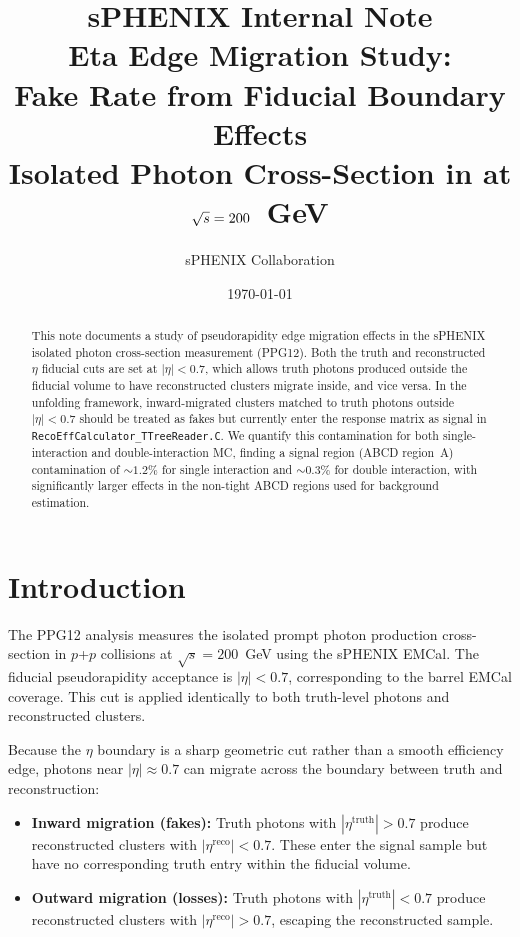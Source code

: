 \documentclass[11pt,letterpaper]{article}
\title{%
  \vspace{-1cm}
  {\large \textbf{sPHENIX Internal Note}}\\[0.5cm]
  {\LARGE \textbf{Eta Edge Migration Study:\\
  Fake Rate from Fiducial Boundary Effects}}\\[0.3cm]
  {\large Isolated Photon Cross-Section in \pp{} at $\sqs = 200$~GeV}
}
\author{sPHENIX Collaboration}
\date{\today}
\newcommand{\pp}{\mbox{$p$+$p$}}
\newcommand{\sqs}{\mbox{$\sqrt{s}$}}
\newcommand{\abseta}{\ensuremath{|\eta|}}
\begin{document}
\maketitle

\begin{abstract}
This note documents a study of pseudorapidity edge migration effects in the
sPHENIX isolated photon cross-section measurement (PPG12). Both the truth and
reconstructed $\eta$ fiducial cuts are set at $\abseta < 0.7$, which allows
truth photons produced outside the fiducial volume to have reconstructed
clusters migrate inside, and vice versa. In the unfolding framework, inward-migrated
clusters matched to truth photons outside $\abseta < 0.7$ should be treated as
fakes but currently enter the response matrix as signal in
\texttt{RecoEffCalculator\_TTreeReader.C}. We quantify this contamination for
both single-interaction and double-interaction MC, finding a signal region (ABCD
region~A) contamination of ${\sim}1.2\%$ for single interaction and
${\sim}0.3\%$ for double interaction, with significantly larger effects in the
non-tight ABCD regions used for background estimation.
\end{abstract}

\tableofcontents
\newpage

\section{Introduction}
\label{sec:intro}

The PPG12 analysis measures the isolated prompt photon production cross-section
in \pp{} collisions at $\sqs = 200$~GeV using the sPHENIX EMCal. The fiducial
pseudorapidity acceptance is $\abseta < 0.7$, corresponding to the barrel EMCal
coverage. This cut is applied identically to both truth-level photons and
reconstructed clusters.

Because the $\eta$ boundary is a sharp geometric cut rather than a smooth
efficiency edge, photons near $|\eta| \approx 0.7$ can migrate across the
boundary between truth and reconstruction:
\begin{itemize}
  \item \textbf{Inward migration (fakes):} Truth photons with
    $|\eta^\text{truth}| > 0.7$ produce reconstructed clusters with
    $|\eta^\text{reco}| < 0.7$. These enter the signal sample but have no
    corresponding truth entry within the fiducial volume.
  \item \textbf{Outward migration (losses):} Truth photons with
    $|\eta^\text{truth}| < 0.7$ produce reconstructed clusters with
    $|\eta^\text{reco}| > 0.7$, escaping the reconstructed sample.
\end{itemize}
\end{document}
